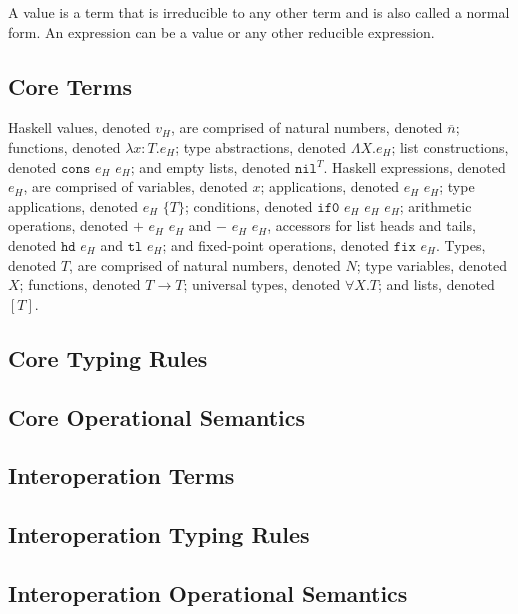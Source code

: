 A value is a term that is irreducible to any other term and is also called a normal form.  An expression can be a value or any other reducible expression.

\subsection{Core Terms}

Haskell values, denoted $v_{H}$, are comprised of natural numbers, denoted $\overline{n}$; functions, denoted $\lambda x:T.e_{H}$; type abstractions, denoted $\Lambda X.e_{H}$; list constructions, denoted $\mathtt{cons}$ $e_{H}$ $e_{H}$; and empty lists, denoted $\mathtt{nil}^{T}$.  Haskell expressions, denoted $e_{H}$, are comprised of variables, denoted $x$; applications, denoted $e_{H}$ $e_{H}$; type applications, denoted $e_{H}$ $\lbrace T\rbrace$; conditions, denoted $\mathtt{if0}$ $e_{H}$ $e_{H}$ $e_{H}$; arithmetic operations, denoted $+$ $e_{H}$ $e_{H}$ and $-$ $e_{H}$ $e_{H}$, accessors for list heads and tails, denoted $\mathtt{hd}$ $e_{H}$ and $\mathtt{tl}$ $e_{H}$; and fixed-point operations, denoted $\mathtt{fix}$ $e_{H}$.  Types, denoted $T$, are comprised of natural numbers, denoted $N$; type variables, denoted $X$; functions, denoted $T\rightarrow T$; universal types, denoted $\forall X.T$; and lists, denoted $[T]$.

\subsection{Core Typing Rules}

\subsection{Core Operational Semantics}

\subsection{Interoperation Terms}

\subsection{Interoperation Typing Rules}

\subsection{Interoperation Operational Semantics}